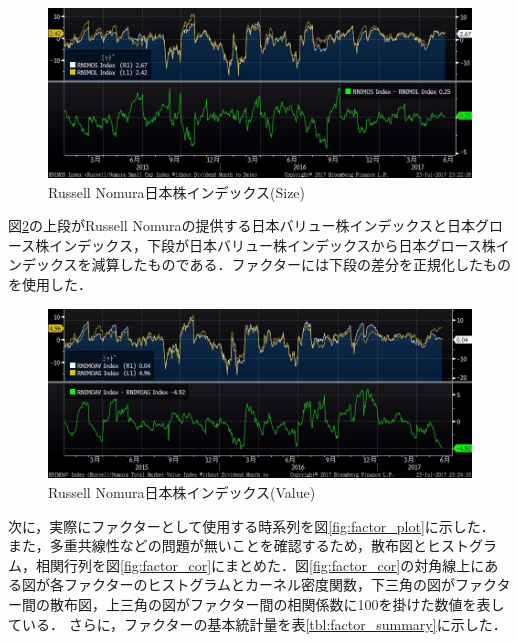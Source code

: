 ﻿\documentclass[11pt]{jreport}
\begin{document}
\begin{figure}[H]
	\begin{center}
		\includegraphics[width=15cm]{./fig/Size.jpg}
		\caption{Russell Nomura日本株インデックス(Size)}
		\label{fig:Size}
	\end{center}
\end{figure}
図\ref{fig:Value}の上段がRussell Nomuraの提供する日本バリュー株インデックスと日本グロース株インデックス，下段が日本バリュー株インデックスから日本グロース株インデックスを減算したものである．ファクターには下段の差分を正規化したものを使用した．
\begin{figure}[H]
	\begin{center}
		\includegraphics[width=15cm]{./fig/Value.jpg}
		\caption{Russell Nomura日本株インデックス(Value)}
		\label{fig:Value}
	\end{center}
\end{figure}

次に，実際にファクターとして使用する時系列を図\ref{fig:factor_plot}に示した．
また，多重共線性などの問題が無いことを確認するため，散布図とヒストグラム，相関行列を図\ref{fig:factor_cor}にまとめた．図\ref{fig:factor_cor}の対角線上にある図が各ファクターのヒストグラムとカーネル密度関数，下三角の図がファクター間の散布図，上三角の図がファクター間の相関係数に100を掛けた数値を表している．
さらに，ファクターの基本統計量を表\ref{tbl:factor_summary}に示した．
\end{document}
